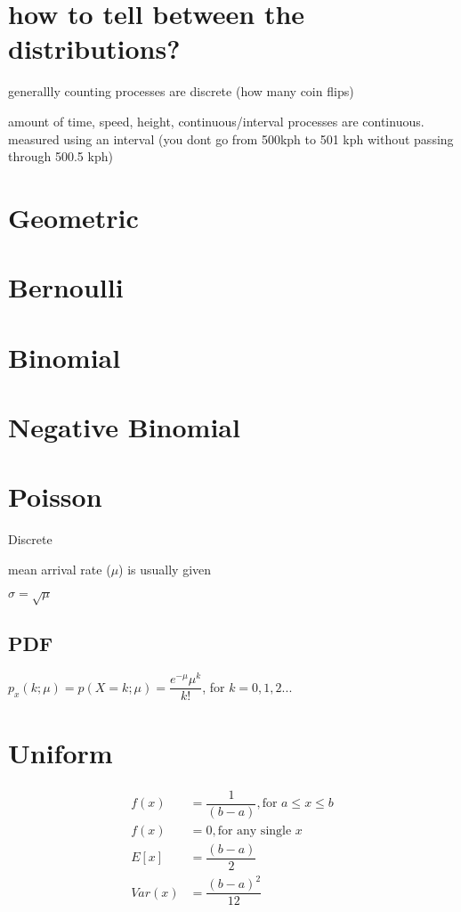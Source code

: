 \documentclass[12pt,fleqn]{article}
\begin{document}

\section{how to tell between the distributions?}

generallly counting processes are discrete (how many coin flips)

amount of time, speed, height, continuous/interval processes are continuous. measured using an interval (you dont go from 500kph to 501 kph without passing through 500.5 kph)



\section{Geometric}
\section{Bernoulli}
\section{Binomial}
\section{Negative Binomial}
\section{Poisson}
Discrete

mean arrival rate ($\mu$) is usually given

$\sigma = \sqrt{\mu}$

\subsection{PDF}
$p_x(k;\mu) = p(X=k; \mu) = \dfrac{e^{-\mu}\mu^k}{k!}$, for $k = 0,1,2...$
\section{Uniform}

\begin{align*}
	f(x) &= \dfrac{1}{(b-a)}, \text{for $a \le x \le b$}\\
	f(x) &= 0, \text{for any single $x$}\\
	E[x] &= \dfrac{(b-a)}{2}\\
	Var(x) &=\dfrac{(b-a)^2}{12}
\end{align*}
\end{document}
